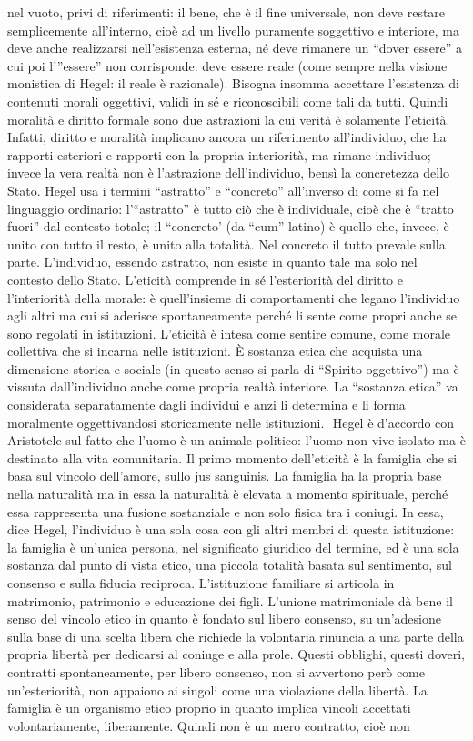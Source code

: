 \documentclass[a4paper,12pt,oneside,openany]{book}%
\begin{document}
nel vuoto, privi di riferimenti: il bene, che è il fine universale, non deve restare semplicemente all’interno, cioè ad un livello puramente soggettivo e interiore, ma deve anche realizzarsi nell’esistenza esterna, né deve rimanere un “dover essere” a cui poi l’”essere” non corrisponde: deve essere reale (come sempre nella visione monistica di Hegel: il reale è razionale). Bisogna insomma accettare l’esistenza di contenuti morali oggettivi, validi in sé e riconoscibili come tali da tutti. Quindi moralità e diritto formale sono due astrazioni la cui verità è solamente l’eticità. Infatti, diritto e moralità implicano ancora un riferimento all’individuo, che ha rapporti esteriori e rapporti con la propria interiorità, ma rimane individuo; invece la vera realtà non è l’astrazione dell’individuo, bensì la concretezza dello Stato. Hegel usa i termini “astratto” e “concreto” all’inverso di come si fa nel linguaggio ordinario: l’“astratto” è tutto ciò che è individuale, cioè che è “tratto fuori” dal contesto totale; il “concreto’ (da “cum” latino) è quello che, invece, è unito con tutto il resto, è unito alla totalità. Nel concreto il tutto prevale sulla parte. L’individuo, essendo astratto, non esiste in quanto tale ma solo nel contesto dello Stato. L’eticità comprende in sé l’esteriorità del diritto e l’interiorità della morale: è quell’insieme di comportamenti che legano l’individuo agli altri ma cui si aderisce spontaneamente perché li sente come propri anche se sono regolati in istituzioni. L’eticità è intesa come sentire comune, come morale collettiva che si incarna nelle istituzioni. È sostanza etica che acquista una dimensione storica e sociale (in questo senso si parla di “Spirito oggettivo”) ma è vissuta dall’individuo anche come propria realtà interiore. La “sostanza etica” va considerata separatamente dagli individui e anzi li determina e li forma moralmente oggettivandosi storicamente nelle istituzioni.  Hegel è d’accordo con Aristotele sul fatto che l’uomo è un animale politico: l’uomo non vive isolato ma è destinato alla vita comunitaria. Il primo momento dell’eticità è la famiglia che si basa sul vincolo dell’amore, sullo jus sanguinis. La famiglia ha la propria base nella naturalità ma in essa la naturalità è elevata a momento spirituale, perché essa rappresenta una fusione sostanziale e non solo fisica tra i coniugi. In essa, dice Hegel, l’individuo è una sola cosa con gli altri membri di questa istituzione: la famiglia è un’unica persona, nel significato giuridico del termine, ed è una sola sostanza dal punto di vista etico, una piccola totalità basata sul sentimento, sul consenso e sulla fiducia reciproca. L’istituzione familiare si articola in matrimonio, patrimonio e educazione dei figli. L’unione matrimoniale dà bene il senso del vincolo etico in quanto è fondato sul libero consenso, su un’adesione sulla base di una scelta libera che richiede la volontaria rinuncia a una parte della propria libertà per dedicarsi al coniuge e alla prole. Questi obblighi, questi doveri, contratti spontaneamente, per libero consenso, non si avvertono però come un’esteriorità, non appaiono ai singoli come una violazione della libertà. La famiglia è un organismo etico proprio in quanto implica vincoli accettati volontariamente, liberamente. Quindi non è un mero contratto, cioè non 
\end{document}
